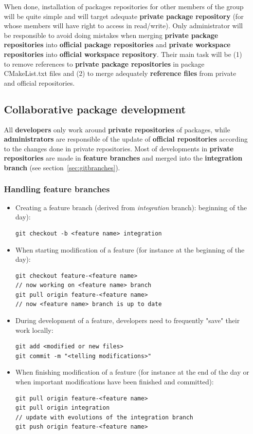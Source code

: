 \documentclass[12pt,a4paper]{article}
\begin{document}
When done, installation of packages repositories for other members of the group will be quite simple and will target adequate \textbf{private package repository} (for whose members will have right to access in read/write). Only administrator will be responsible to avoid doing mistakes when merging \textbf{private package repositories} into \textbf{official package repositories} and \textbf{private workspace repositories} into \textbf{official workspace repository}. Their main task will be (1) to remove references to \textbf{private package repositories} in package CMakeList.txt files and (2) to merge adequately \textbf{reference files} from private and official repositories.

\subsection{Collaborative package development}

All \textbf{developers} only work around \textbf{private repositories} of packages, while \textbf{administrators} are responsible of the update of \textbf{official repositories} according to the changes done in private repositories. Most of developments in \textbf{private repositories} are made in \textbf{feature branches} and merged into the \textbf{integration branch} (see section~\ref{sec:gitbranches}).

\subsubsection{Handling feature branches}

\begin{itemize}
\item Creating a feature branch (derived from \textit{integration} branch):
beginning of the day):
\begin{verbatim}
git checkout -b <feature name> integration
\end{verbatim}
\item When starting modification of a feature (for instance at the beginning of the day):
\begin{verbatim}
git checkout feature-<feature name> 
// now working on <feature name> branch
git pull origin feature-<feature name>
// now <feature name> branch is up to date
\end{verbatim}
\item During development of a feature, developers need to frequently "save" their work locally:
\begin{verbatim}
git add <modified or new files>
git commit -m "<telling modifications>"
\end{verbatim}
\item When finishing modification of a feature (for instance at the end of the day or when important modifications have been finished and committed):
\begin{verbatim}
git pull origin feature-<feature name>
git pull origin integration
// update with evolutions of the integration branch
git push origin feature-<feature name>
\end{verbatim}
\end{itemize}
\end{document}
